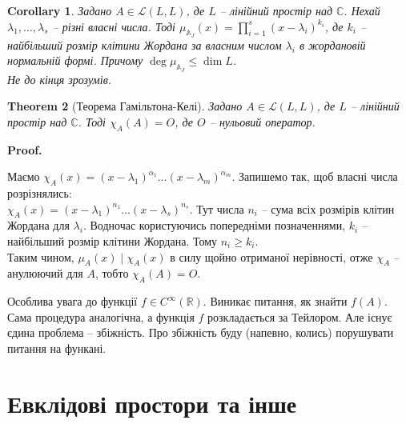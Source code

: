 \documentclass[a4paper, 10pt]{article}
\makeatletter
\theoremstyle{theoremdd}
\newtheorem{theorem}{Theorem}[subsection]
\newtheorem{remark}[theorem]{Remark}
\newtheorem{corollary}[theorem]{Corollary}
\renewenvironment{proof}[1][Proof.\\]{\par
\pushQED{\hfill \qed}%
\normalfont \topsep6\p@\@plus6\p@\relax
\trivlist
\item\relax
{\bfseries
#1\@addpunct{.}}\hspace\labelsep\ignorespaces
}{%
\popQED\endtrivlist\@endpefalse
}
\makeatother
\begin{document}
\begin{corollary}
Задано $A \in \mathcal{L}(L,L)$, де $L$ -- лінійний простір над $\mathbb{C}$. Нехай $\lambda_1,\dots,\lambda_s$ -- різні власні числа. Тоді $\mu_{\mathbb{A}_J}(x) = \displaystyle\prod_{i=1}^s (x - \lambda_i)^{k_i}$, де $k_i$ -- найбільший розмір клітини Жордана за власним числом $\lambda_i$ в жордановій нормальній формі. Причому $\deg \mu_{\mathbb{A}_J} \leq \dim L$.\\
\textit{Не до кінця зрозумів.}
\end{corollary}

\begin{theorem}[Теорема Гамільтона-Келі]
Задано $A \in \mathcal{L}(L,L)$, де $L$ -- лінійний простір над $\mathbb{C}$. Тоді $\chi_A (A) = O$, де $O$ -- нульовий оператор.
\end{theorem}

\begin{proof}
Маємо $\chi_A(x) = (x-\lambda_1)^{\alpha_1} \dots (x-\lambda_m)^{\alpha_m}$. Запишемо так, щоб власні числа розрізнялись:\\
$\chi_A(x) = (x-\lambda_1)^{n_1} \dots (x-\lambda_s)^{n_s}$. Тут числа $n_i$ -- сума всіх розмірів клітин Жордана для $\lambda_i$. Водночас користуючись попередніми позначеннями, $k_i$ -- найбільший розмір клітини Жордана. Тому $n_i \geq k_i$.\\
Таким чином, $\mu_A(x) \mid \chi_A(x)$ в силу щойно отриманої нерівності, отже $\chi_A$ -- анулюючий для $A$, тобто $\chi_A(A) = O$.
\end{proof}

\iffalse
\begin{remark}
Насправді, дана теорема виконується для довільного поля. Не просто для тих полів, де характеристичний многочлен розкладається на лінійні множники. Але це поза темою.
\end{remark}
\fi
\noindent
Особлива увага до функції $f \in C^{\infty}(\mathbb{R})$. Виникає питання, як знайти $f(A)$. Сама процедура аналогічна, а функція $f$ розкладається за Тейлором. Але існує єдина проблема -- збіжність. Про збіжність буду (напевно, колись) порушувати питання на функані.
\newpage

\section{Евклідові простори та інше}
\end{document}
